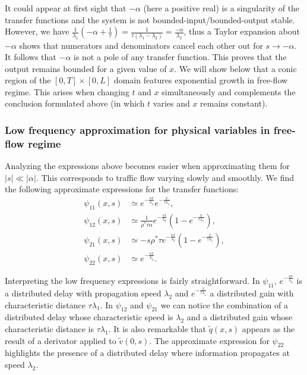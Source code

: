 \documentclass[5p,twocolumn]{elsarticle}
\begin{document}
It could appear at first sight that $-\alpha$ (here a positive real) is a singularity of the transfer functions and the system is not bounded-input/bounded-output stable. However, we have $\frac{1}{\lambda_{1}}\left(-\alpha+\frac{1}{\tau}\right)=\frac{1}{\tau\left(\lambda_{1} - \lambda_{2}\right)}=\frac{-\alpha}{\lambda_{2}}$, thus a Taylor expansion about $-\alpha$ shows that numerators and denominators cancel each other out for $s \rightarrow -\alpha$. It follows that $-\alpha$ is not a pole of any transfer function. This proves that the output remains bounded for a given value of $x$. We will show below that a conic region of the $\left[0,T\right] \times \left[0,L\right]$ domain features exponential growth in free-flow regime. This arises when changing $t$ and $x$ simultaneously and complements the conclusion formulated above (in which $t$ varies and $x$ remains constant).

\subsubsection{Low frequency approximation for physical variables in free-flow regime}
Analyzing the expressions above becomes easier when approximating them for $\left|s\right|\ll\left|\alpha\right|$. This corresponds to traffic flow varying slowly and smoothly. We find the following approximate expressions for the transfer functions:
\begin{subequations}
\begin{align}
\psi_{11}(x,s)
&\simeq
e^{-\frac{sx}{\lambda_{2}}}
e^{-\frac{x}{\tau\lambda_{1}}}
, \\
\psi_{12}(x,s)
&\simeq
\frac{
	1
}{
	\rho^{*}\tau\alpha
}
e^{-\frac{sx}{\lambda_{2}}}
\left(
	1 - e^{-\frac{x}{\tau\lambda_{1}}}
\right)
, \\
\psi_{21}(x,s)
& \simeq
- s \rho^{*} \tau
e^{-\frac{sx}{\lambda_{2}}}
\left(
	1 - e^{-\frac{x}{\tau\lambda_{1}}}
\right)
, \\
\psi_{22}(x,s)
&\simeq
e^{-\frac{sx}{\lambda_{2}}}
.
\end{align}
\end{subequations}

Interpreting the low frequency expressions is fairly straightforward.
In $\psi_{11}$, $e^{-\frac{sx}{\lambda_{2}}}$ is a distributed delay with propagation speed $\lambda_{2}$ and $e^{-\frac{x}{\tau\lambda_{1}}}$ a distributed gain with characteristic distance $\tau\lambda_{1}$. 
In $\psi_{12}$ and $\psi_{21}$ we can notice the combination of a distributed delay whose  characteristic speed is $\lambda_{2}$ and a distributed gain whose characteristic distance is $\tau\lambda_{1}$. It is also remarkable that $\widetilde{q}(x,s)$ appears as the result of a derivator applied to $\widetilde{v}(0,s)$.
The approximate expression for $\psi_{22}$ highlights the presence of a distributed delay where information propagates at speed $\lambda_{2}$.
\end{document}

